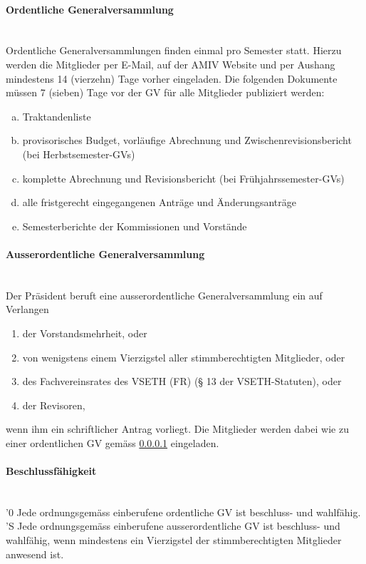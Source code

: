 \documentclass[a4paper,11pt]{article}
\newcommand{\nl}{\\[1.5ex]}
\begin{document}
\paragraph{Ordentliche Generalversammlung} \label{Ordentliche_Generalversammlung} \ \\
Ordentliche Generalversammlungen finden einmal pro Semester statt. Hierzu werden die Mitglieder per E-Mail, auf der AMIV Website und per Aushang mindestens 14 (vierzehn) Tage vorher eingeladen. Die folgenden Dokumente müssen 7 (sieben) Tage vor der GV für alle Mitglieder publiziert werden:
\begin{enumerate}[(a)]
    \item Traktandenliste
    \item provisorisches Budget, vorläufige Abrechnung und Zwischenrevisionsbericht (bei Herbstsemester-GVs)
    \item komplette Abrechnung und Revisionsbericht (bei Frühjahrssemester-GVs)
    \item alle fristgerecht eingegangenen Anträge und Änderungsanträge
    \item Semesterberichte der Kommissionen und Vorstände
\end{enumerate}


\paragraph{Ausserordentliche Generalversammlung} \ \\
Der Präsident beruft eine ausserordentliche Generalversammlung ein auf Verlangen
\begin{enumerate}
  \item der Vorstandsmehrheit, oder
  \item von wenigstens einem Vierzigstel aller stimmberechtigten Mitglieder, oder
  \item des Fachvereinsrates des VSETH (FR) (§ 13 der VSETH-Statuten), oder
  \item der Revisoren,
\end{enumerate}
wenn ihm ein schriftlicher Antrag vorliegt. Die Mitglieder werden dabei wie zu einer ordentlichen GV gemäss \ref{Ordentliche_Generalversammlung} eingeladen.


\paragraph{Beschlussfähigkeit} \ \\
'0 Jede ordnungsgemäss einberufene ordentliche GV ist beschluss- und wahlfähig.\nl
'S Jede ordnungsgemäss einberufene ausserordentliche GV ist beschluss- und wahlfähig, wenn mindestens ein Vierzigstel der stimmberechtigten Mitglieder anwesend ist.
\end{document}
